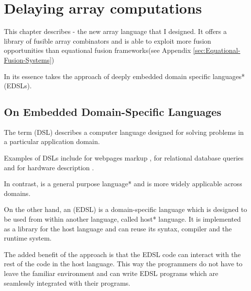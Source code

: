 \documentclass[preamble.tex]{subfiles}
\begin{document}
\clearpage

\chapter{Delaying array computations}

This chapter describes \LiveFusion - the new array language that I designed. It offers a library of fusible array combinators and is able to exploit more fusion opportunities than equational fusion frameworks\ieqf (see Appendix \ref{sec:Equational-Fusion-Systems})

In its essence \LiveFusion takes the approach of \*deeply embedded domain specific languages* (EDSLs).\iedsl


\section{On Embedded Domain-Specific Languages}
\iedsl

The term  (DSL) describes a computer language designed for solving problems in a particular application domain.

Examples of DSLs include  for webpages markup \cite{HTML},  for relational database queries \cite{SQL} and  for hardware description \cite{Verilog}.

In contrast, \Haskell \cite{Pey03} is a \*general purpose language* and is more widely applicable across domains.

On the other hand, an  (EDSL) is a domain-specific language which is designed to be used from within another language, called \*host* language. It is implemented as a library for the host language and can reuse its syntax, compiler and the runtime system.

The added benefit of the approach is that the EDSL code can interact with the rest of the code in the host language. This way the programmers do not have to leave the familiar environment and can write EDSL programs which are seamlessly integrated with their programs.
\end{document}
